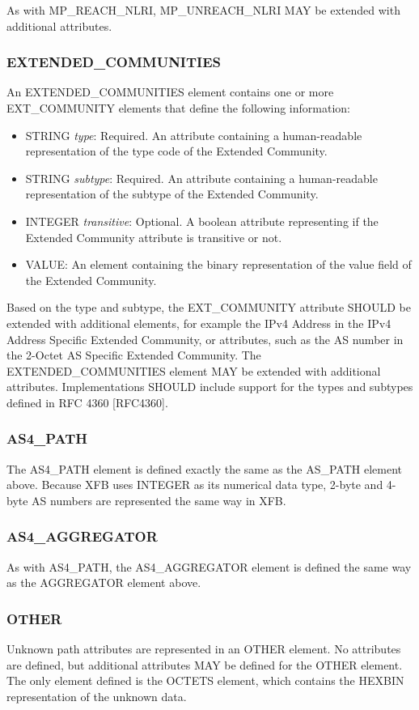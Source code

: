 \documentclass{article}
\begin{document}
As with MP_REACH_NLRI, MP_UNREACH_NLRI MAY be extended with additional attributes.

\subsubsection{EXTENDED_COMMUNITIES}
An EXTENDED_COMMUNITIES element contains one or more EXT_COMMUNITY elements that define the following information:

\begin{itemize}
\item{STRING \emph{type}: Required. An attribute containing a human-readable representation of the type code of the Extended Community.}
\item{STRING \emph{subtype}: Required. An attribute containing a human-readable representation of the subtype of the Extended Community.}
\item{INTEGER \emph{transitive}: Optional. A boolean attribute representing if the Extended Community attribute is transitive or not.}
\item{VALUE: An element containing the binary representation of the value field of the Extended Community.}
\end{itemize}

Based on the type and subtype, the EXT_COMMUNITY attribute SHOULD be extended with additional elements, for example the IPv4 Address in the IPv4 Address Specific Extended Community, or attributes, such as the AS number in the 2-Octet AS Specific Extended Community.  The EXTENDED_COMMUNITIES element MAY be extended with additional attributes.  Implementations SHOULD include support for the types and subtypes defined in RFC 4360 [RFC4360].

\subsubsection{AS4_PATH}
The AS4_PATH element is defined exactly the same as the AS_PATH element above.  Because XFB uses INTEGER as its numerical data type, 2-byte and 4-byte AS numbers are represented the same way in XFB.

\subsubsection{AS4_AGGREGATOR}
As with AS4_PATH, the AS4_AGGREGATOR element is defined the same way as the AGGREGATOR element above.

\subsubsection{OTHER}
Unknown path attributes are represented in an OTHER element.  No attributes are defined, but additional attributes MAY be defined for the OTHER element.  The only element defined is the OCTETS element, which contains the HEXBIN representation of the unknown data.
\end{document}
